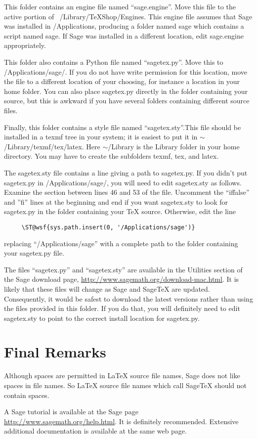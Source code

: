 \documentclass[11pt, oneside]{amsart}
\begin{document}
This folder contains an engine file named ``sage.engine''. Move this file to the active portion of ~/Library/TeXShop/Engines. This engine file assumes that Sage was installed in /Applications, producing a folder named sage which contains a script named sage. If Sage was installed in a different location, edit sage.engine appropriately.

This folder also contains a Python file named ``sagetex.py''. Move this to /Applications/sage/. If you do not have write permission for this location, move the file to a different location of your choosing, for instance a location in your home folder. You can also place sagetex.py directly in the folder containing your source, but this is awkward if you have several folders containing different source files.

Finally, this folder contains a style file named ``sagetex.sty''.This file should be installed in a texmf tree in your system; it is easiest to put it in  $\sim$/Library/texmf/tex/latex. Here $\sim$/Library is the Library folder in your home directory. You may have to create the subfolders texmf, tex, and latex.

The sagetex.sty file contains a line giving a path to sagetex.py. If you didn't put sagetex.py in /Applications/sage/, you will need to edit sagetex.sty as follows. Examine the section between lines 46 and 53 of the file. Uncomment the ``iffalse'' and ''fi'' lines at the beginning and end if you want sagetex.sty to look for sagetex.py in the folder containing your TeX source. Otherwise, edit the line
\begin{verbatim}
     \ST@wsf{sys.path.insert(0, '/Applications/sage')}
\end{verbatim}
replacing ``/Applications/sage'' with a complete path to the folder containing your sagetex.py file.

The files ``sagetex.py'' and ``sagetex.sty'' are available in the Utilities section of the Sage download page,
\url{http://www.sagemath.org/download-mac.html}. It is likely that these files will change as Sage and SageTeX are updated. Consequently, it would be safest to download the latest versions rather than using the files provided in this folder. If you do that, you will definitely need to edit sagetex.sty to point to the correct install location for sagetex.py. 

\section{Final Remarks}
Although spaces are permitted in LaTeX source file names, Sage does not like spaces in file names. So LaTeX source file names which call SageTeX should not contain spaces.

A Sage tutorial is available at the Sage page \url{http://www.sagemath.org/help.html}. It is definitely recommended. Extensive additional documentation is available at the same web page.
\end{document}
